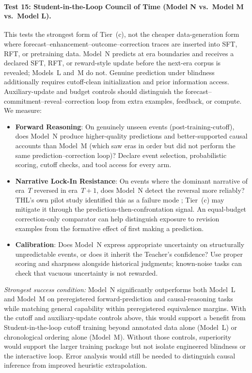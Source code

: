 \paragraph{Test 15: Student-in-the-Loop Council of Time (Model N vs.\ Model M vs.\ Model L).}
This tests the strongest form of Tier~(c), not the cheaper data-generation form where forecast--enhancement--outcome--correction traces are inserted into SFT, RFT, or pretraining data. Model~N predicts at era boundaries and receives a declared SFT, RFT, or reward-style update before the next-era corpus is revealed; Models~L and~M do not. Genuine prediction under blindness additionally requires cutoff-clean initialization and prior information access. Auxiliary-update and budget controls should distinguish the forecast--commitment--reveal--correction loop from extra examples, feedback, or compute. We measure:
\begin{itemize}
    \item \textbf{Forward Reasoning}: On genuinely unseen events (post-training-cutoff), does Model~N produce higher-quality predictions and better-supported causal accounts than Model~M (which saw eras in order but did not perform the same prediction--correction loop)? Declare event selection, probabilistic scoring, cutoff checks, and tool access for every arm.
    \item \textbf{Narrative Lock-In Resistance}: On events where the dominant narrative of era~$T$ reversed in era~$T{+}1$, does Model~N detect the reversal more reliably? THL's own pilot study identified this as a failure mode \cite{westerberg2026thl}; Tier~(c) may mitigate it through the prediction-then-confrontation signal. An equal-budget correction-only comparator can help distinguish exposure to revision examples from the formative effect of first making a prediction.
    \item \textbf{Calibration}: Does Model~N express appropriate uncertainty on structurally unpredictable events, or does it inherit the Teacher's confidence? Use proper scoring and sharpness alongside historical judgments; known-noise tasks can check that vacuous uncertainty is not rewarded.
\end{itemize}
\emph{Strongest success condition:} Model~N significantly outperforms both
Model~L and Model~M on preregistered forward-prediction and causal-reasoning
tasks while matching general capability within preregistered equivalence margins. With the
cutoff and auxiliary-update controls above, this would support a benefit from
Student-in-the-loop cutoff training beyond annotated data alone (Model~L) or
chronological ordering alone (Model~M). Without those controls, superiority
would support the larger training package but not isolate engineered blindness
or the interactive loop. Error analysis would still be needed to distinguish
causal inference from improved heuristic extrapolation.

